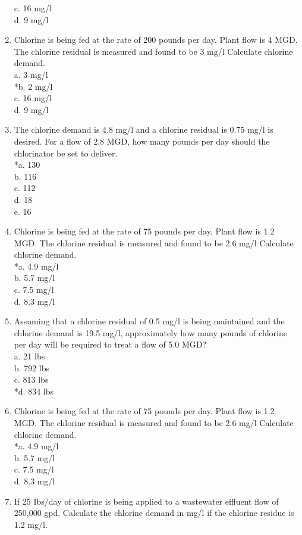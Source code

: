 \begin{enumerate}
c. 16 mg/l \\
d. 9 mg/l \\
\item Chlorine is being fed at the rate of 200 pounds per day. Plant flow is 4 MGD. The chlorine residual is measured and found to be 3 mg/l Calculate chlorine demand. \\
a. 3 mg/l \\
*b. 2 mg/l \\
c. 16 mg/l \\
d. 9 mg/l \\
\item The chlorine demand is 4.8 mg/l and a chlorine residual is 0.75 mg/l is desired.  For a flow of 2.8 MGD, how many pounds per day should the chlorinator be set to deliver. \\
*a. 130 \\
b. 116 \\
c. 112 \\
d. 18 \\
e. 16 \\
\item Chlorine is being fed at the rate of 75 pounds per day. Plant flow is 1.2 MGD. The chlorine residual is measured and found to be 2.6 mg/l Calculate chlorine demand. \\
*a. 4.9 mg/l \\
b. 5.7 mg/l \\
c. 7.5 mg/l \\
d. 8.3 mg/l \\
\item Assuming that a chlorine residual of 0.5 mg/l is being maintained and the chlorine demand is 19.5 mg/l, approximately how many pounds of chlorine per day will be required to treat a flow of 5.0 MGD? \\
a. 21 lbs \\
b. 792 lbs \\
c. 813 lbs \\
*d. 834 lbs \\
\item Chlorine is being fed at the rate of 75 pounds per day. Plant flow is 1.2 MGD. The chlorine residual is measured and found to be 2.6 mg/l Calculate chlorine demand. \\
*a. 4.9 mg/l \\
b. 5.7 mg/l \\
c. 7.5 mg/l \\
d. 8.3 mg/l \\
\item If 25 Ibs/day of chlorine is being applied to a wastewater effluent flow of 250,000 gpd. Calculate the chlorine demand in mg/l if the chlorine residue is 1.2 mg/l. \\

\end{enumerate}
